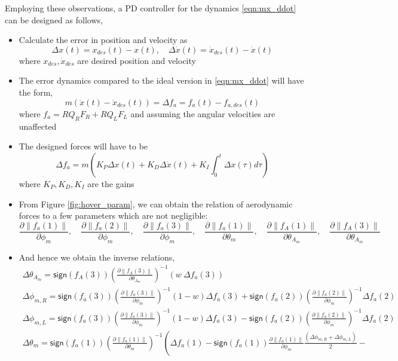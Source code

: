 \documentclass[10pt]{article}
\newcommand{\norm}[1]{\ensuremath{\left\| #1 \right\|}}
\newcommand{\parenth}[1]{\ensuremath{\left( #1 \right)}}
\newcommand{\sign}[1]{\ensuremath{\mathsf{sign} \left( #1 \right)}}
\begin{document}
Employing these observations, a PD controller for the dynamics \eqref{eqn:mx_ddot} can be designed as follows,
\begin{itemize}
	\item Calculate the error in position and velocity as
	\[ \Delta x(t) = x_{des}(t) - x(t),\quad \Delta \dot x(t) = \dot x_{des}(t) - \dot x(t) \]
	where $ x_{des}, \dot x_{des} $ are desired position and velocity
	\item The error dynamics compared to the ideal version in \eqref{eqn:mx_ddot} will have the form,
	\[ m (\ddot{x}(t) - \ddot{x}_{des}(t)) = \Delta f_a = f_a(t) - f_{a, des} (t)\]
	where $ f_a = R Q_R F_R + R Q_L F_L $ and assuming the angular velocities are unaffected
	\item The designed forces will have to be 
	\begin{equation} \label{eqn:PID_controller}
	\Delta f_a = m (K_P \Delta x (t) + K_D \Delta\dot x(t) + K_I \int_{0}^{t} \Delta x(\tau) d\tau)
	\end{equation}
	where $ K_P, K_D, K_I $ are the gains
	\item From Figure \ref{fig:hover_param}, we can obtain the relation of aerodynamic forces to a few parameters which are not negligible:
	\[ \frac{\partial \norm{f_a(1)}}{\partial \phi_m},\quad \frac{\partial \norm{f_a(2)}}{\partial \phi_m},\quad \frac{\partial \norm{f_a(3)}}{\partial \phi_m},\quad \frac{\partial \norm{f_a(1)}}{\partial \theta_m},\quad \frac{\partial \norm{f_A(1)}}{\partial \theta_{A_m}},\quad \frac{\partial \norm{f_A(3)}}{\partial \theta_{A_m}} \]
	\item And hence we obtain the inverse relations,
	\begin{gather*}
		\Delta \theta_{A_m} = \sign{f_A(3)} \left(\frac{\partial \norm{f_A(3)}}{\partial \theta_{A_m}} \right)^{-1} (w\ \Delta f_a(3)) \\
		\Delta \phi_{m, R} = \sign{f_a(3)} \left(\frac{\partial \norm{f_a(3)}}{\partial \phi_m} \right)^{-1} (1-w) \Delta f_a(3) + \sign{f_a(2)} \left( \frac{\partial \norm{f_a(2)}}{\partial \phi_m} \right)^{-1} \Delta f_a(2) \\
		\Delta \phi_{m, L} = \sign{f_a(3)} \left(\frac{\partial \norm{f_a(3)}}{\partial \phi_m} \right)^{-1} (1-w) \Delta f_a(3) - \sign{f_a(2)} \left( \frac{\partial \norm{f_a(2)}}{\partial \phi_m} \right)^{-1} \Delta f_a(2) \\
		\Delta \theta_m = \sign{f_a(1)} \left( \frac{\partial \norm{f_a(1)}}{\partial \theta_m} \right)^{-1} \left(\Delta f_a(1) - \sign{f_a(1)} \frac{\partial \norm{f_a(1)}}{\partial \phi_m} \frac{\parenth{\Delta \phi_{m, R} + \Delta \phi_{m, L}}}{2} - \right. \\

\end{gather*}
\end{itemize}
\end{document}
